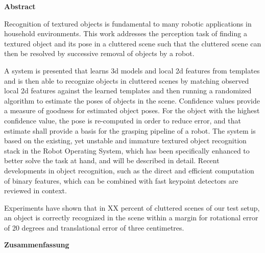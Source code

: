 

\clearemptydoublepage
{}
{}	

\vspace*{2cm}
\begin{center}
{\Large \bf Abstract}
\end{center}
\vspace{1cm}

Recognition of textured objects is fundamental to many robotic applications in
household environments. This work addresses the perception task of finding a
textured object and its pose in a cluttered scene such that the cluttered scene
can then be resolved by successive removal of objects by a robot.

A system is presented that learns 3d models and local 2d features from
templates and is then able to recognize objects in cluttered scenes by matching
observed local 2d features against the learned templates and then running a
randomized algorithm to estimate the poses of objects in the scene. Confidence
values provide a measure of goodness for estimated object poses. For the object
with the highest confidence value, the pose is re-computed in order to reduce
error, and that estimate shall provide a basis for the grasping pipeline of a
robot. The system is based on the existing, yet unstable and immature textured
object recognition stack in the Robot Operating System, which has been
specifically enhanced to better solve the task at hand, and will be described
in detail. Recent developments in object recognition, such as the direct and
efficient computation of binary features, which can be combined with fast
keypoint detectors are reviewed in context.

Experiments have shown that in XX percent of cluttered scenes of our test
setup, an object is correctly recognized in the scene within a margin for
rotational error of 20 degrees and translational error of three centimetres.

\clearemptydoublepage
{}
{}

\vspace*{2cm}
\begin{center}
{\Large \bf Zusammenfassung}
\end{center}
\vspace{1cm}


